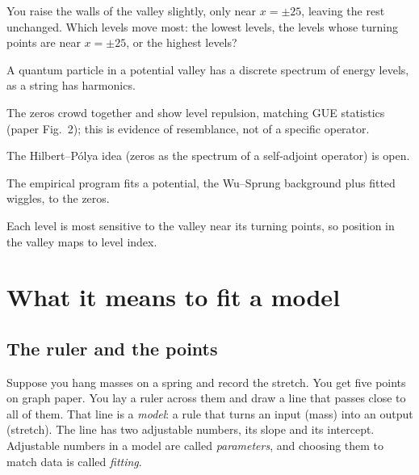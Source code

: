 \begin{checkpoint}
You raise the walls of the valley slightly, only near $x = \pm 25$, leaving the rest unchanged. Which levels move most: the lowest levels, the levels whose turning points are near $x = \pm 25$, or the highest levels?
\end{checkpoint}

\begin{keyideas}
\item A quantum particle in a potential valley has a discrete spectrum of energy levels, as a string has harmonics.
\item The zeros crowd together and show level repulsion, matching GUE statistics (paper Fig.~2); this is evidence of resemblance, not of a specific operator.
\item The Hilbert--P\'olya idea (zeros as the spectrum of a self-adjoint operator) is open.
\item The empirical program fits a potential, the Wu--Sprung background plus fitted wiggles, to the zeros.
\item Each level is most sensitive to the valley near its turning points, so position in the valley maps to level index.
\end{keyideas}

\section{What it means to fit a model}\label{sec:intro-fitting}

\subsection{The ruler and the points}

Suppose you hang masses on a spring and record the stretch. You get five points on graph paper. You lay a ruler across them and draw a line that passes close to all of them. That line is a \emph{model}: a rule that turns an input (mass) into an output (stretch). The line has two adjustable numbers, its slope and its intercept. Adjustable numbers in a model are called \emph{parameters}, and choosing them to match data is called \emph{fitting}.

